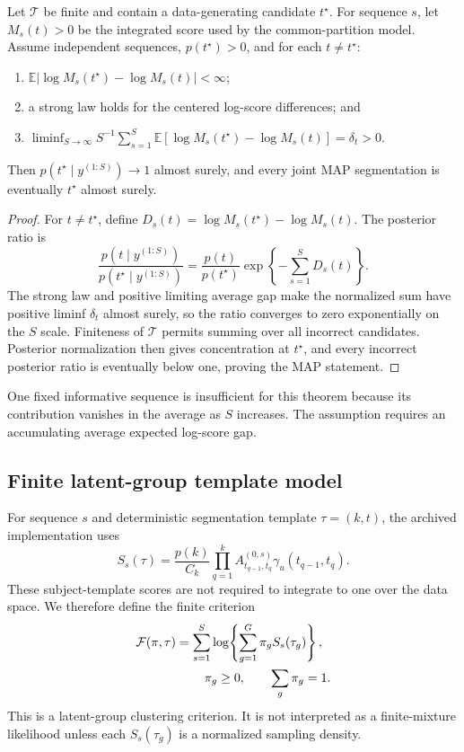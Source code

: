 \begin{theorem}
\label{thm:shared-consistency-paper}
Let $\mathcal T$ be finite and contain a data-generating candidate $t^\star$. For sequence $s$, let $M_s(t)>0$ be the integrated score used by the common-partition model. Assume independent sequences, $p(t^\star)>0$, and for each $t\ne t^\star$:
\begin{enumerate}
\item $\mathbb E|\log M_s(t^\star)-\log M_s(t)|<\infty$;
\item a strong law holds for the centered log-score differences; and
\item $\liminf_{S\to\infty}S^{-1}\sum_{s=1}^{S}\mathbb E[\log M_s(t^\star)-\log M_s(t)]=\delta_t>0$.
\end{enumerate}
Then $p(t^\star\mid y^{(1:S)})\to1$ almost surely, and every joint MAP segmentation is eventually $t^\star$ almost surely.
\end{theorem}
\begin{proof}
For $t\ne t^\star$, define
$D_s(t)=\log M_s(t^\star)-\log M_s(t)$. The posterior ratio is
\[
\frac{p(t\mid y^{(1:S)})}{p(t^\star\mid y^{(1:S)})}
=\frac{p(t)}{p(t^\star)}\exp\!\left\{-\sum_{s=1}^{S}D_s(t)\right\}.
\]
The strong law and positive limiting average gap make the normalized sum have positive liminf $\delta_t$ almost surely, so the ratio converges to zero exponentially on the $S$ scale. Finiteness of $\mathcal T$ permits summing over all incorrect candidates. Posterior normalization then gives concentration at $t^\star$, and every incorrect posterior ratio is eventually below one, proving the MAP statement.
\end{proof}

One fixed informative sequence is insufficient for this theorem because its contribution vanishes in the average as $S$ increases. The assumption requires an accumulating average expected log-score gap.

\subsection{Finite latent-group template model}
For sequence $s$ and deterministic segmentation template $\tau=(k,t)$, the archived implementation uses
\begin{equation}
 S_s(\tau)=\frac{p(k)}{C_k}\prod_{q=1}^{k}
 A^{(0,s)}_{t_{q-1},t_q}\gamma_u(t_{q-1},t_q).
\label{eq:sequence-template-score-paper}
\end{equation}
These subject-template scores are not required to integrate to one over the data space. We therefore define the finite criterion
\begin{align}
\mathcal F(\pi,\tau)
&=\sum_{s=1}^{S}\log\!\left\{\sum_{g=1}^{G}\pi_gS_s(\tau_g)\right\},\nonumber\\
&\hspace{8mm}\pi_g\ge0,\qquad \sum_g\pi_g=1.
\label{eq:latent-group-objective}
\end{align}
This is a latent-group clustering criterion. It is not interpreted as a finite-mixture likelihood unless each $S_s(\tau_g)$ is a normalized sampling density.

